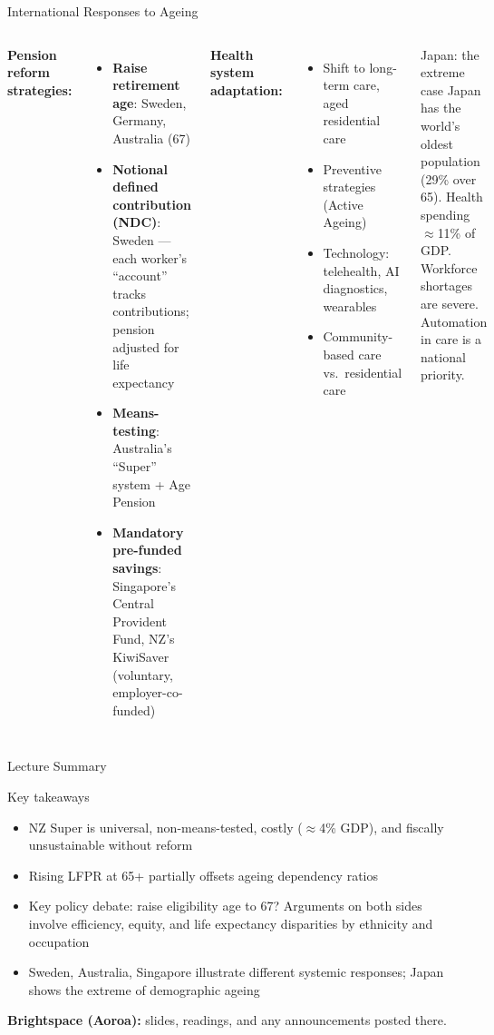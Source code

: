 \documentclass[aspectratio=169, 12pt]{beamer}
\newcommand{\summaryside}[1]{%
  \begin{frame}{Lecture Summary}
    \begin{exampleblock}{Key takeaways}
      \begin{itemize}#1\end{itemize}
    \end{exampleblock}
    \vspace{0.5em}
    {\footnotesize\textcolor{OtagoGold}{\textbf{Brightspace (Aoroa):}} slides, readings, and any announcements posted there.}
  \end{frame}}
\begin{document}
\begin{frame}{International Responses to Ageing}
  \begin{columns}
      \textbf{Pension reform strategies:}
      \begin{itemize}
        \item \textbf{Raise retirement age}: Sweden, Germany, Australia (67)
        \item \textbf{Notional defined contribution (NDC)}: Sweden --- each worker's ``account''
              tracks contributions; pension adjusted for life expectancy
        \item \textbf{Means-testing}: Australia's ``Super'' system + Age Pension
        \item \textbf{Mandatory pre-funded savings}: Singapore's Central Provident Fund,
              NZ's KiwiSaver (voluntary, employer-co-funded)
      \end{itemize}
      \textbf{Health system adaptation:}
      \begin{itemize}
        \item Shift to long-term care, aged residential care
        \item Preventive strategies (Active Ageing)
        \item Technology: telehealth, AI diagnostics, wearables
        \item Community-based care vs.\ residential care
      \end{itemize}
      \vspace{0.3em}
      \begin{alertblock}{Japan: the extreme case}
        Japan has the world's oldest population (29\% over 65). Health spending $\approx$11\%
        of GDP. Workforce shortages are severe. Automation in care is a national priority.
      \end{alertblock}
  \end{columns}
\end{frame}

\summaryside{
  \item NZ Super is universal, non-means-tested, costly ($\approx$4\% GDP), and fiscally unsustainable without reform
  \item Rising LFPR at 65+ partially offsets ageing dependency ratios
  \item Key policy debate: raise eligibility age to 67? Arguments on both sides involve efficiency, equity, and life expectancy disparities by ethnicity and occupation
  \item Sweden, Australia, Singapore illustrate different systemic responses; Japan shows the extreme of demographic ageing
}
\end{document}
